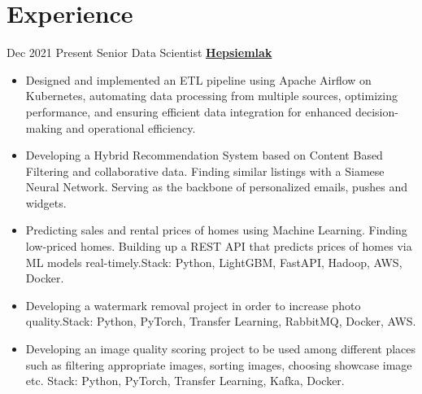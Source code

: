 \documentclass[letterpaper]{DS_class_file} %
\begin{document}
\makeprofile %




\section{Experience}

\begin{twenty}
    \twentyitem
		{Dec 2021}
		{Present}
		{\hspace{0.3cm}Senior Data Scientist}
		{\href{https://www.hepsiemlak.com/}{\textbf{Hepsiemlak}}}
		{}
		{\begin{itemize}
                \item Designed and implemented an ETL pipeline using Apache Airflow on Kubernetes, automating data processing from multiple sources, optimizing performance, and ensuring efficient data integration for enhanced decision-making and operational efficiency.
                \item Developing a Hybrid Recommendation System based on Content Based Filtering and collaborative data. Finding similar listings with a Siamese Neural Network. Serving as the backbone of personalized emails, pushes and widgets.
                \item Predicting sales and rental prices of homes using Machine Learning. Finding low-priced homes. Building up a REST API that predicts prices of homes via ML models real-timely.\newline Stack: Python, LightGBM, FastAPI, Hadoop, AWS, Docker.
                \item Developing a watermark removal project in order to increase photo quality.\newline Stack: Python, PyTorch, Transfer Learning, RabbitMQ, Docker, AWS.
                \item Developing an image quality scoring project to be used among different places such as filtering appropriate images, sorting images, choosing showcase image etc.
                \newline Stack: Python, PyTorch, Transfer Learning, Kafka, Docker.
                

\end{itemize}}
\end{twenty}
\end{document}
